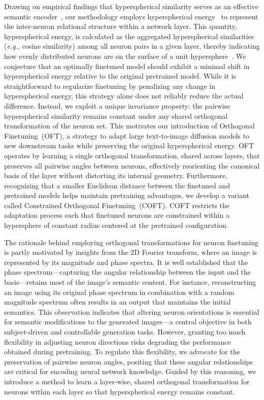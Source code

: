 Drawing on empirical findings that hyperspherical similarity serves as an effective semantic encoder~\cite{liu2017deep,liu2018decoupled,chen2020angular}, our methodology employs hyperspherical energy~\cite{liu2018learning} to represent the inter-neuron relational structure within a network layer. This quantity, hyperspherical energy, is calculated as the aggregated hyperspherical similarities (\emph{e.g.}, cosine similarity) among all neuron pairs in a given layer, thereby indicating how evenly distributed neurons are on the surface of a unit hypersphere~\cite{liu2021learning}. We conjecture that an optimally finetuned model should exhibit a minimal shift in hyperspherical energy relative to the original pretrained model. While it is straightforward to regularize finetuning by penalizing any change in hyperspherical energy, this strategy alone does not reliably reduce the actual difference. Instead, we exploit a unique invariance property: the pairwise hyperspherical similarity remains constant under any shared orthogonal transformation of the neuron set. This motivates our introduction of Orthogonal Finetuning~(OFT), a strategy to adapt large text-to-image diffusion models to new downstream tasks while preserving the original hyperspherical energy. OFT operates by learning a single orthogonal transformation, shared across layers, that preserves all pairwise angles between neurons, effectively reorienting the canonical basis of the layer without distorting its internal geometry. Furthermore, recognizing that a smaller Euclidean distance between the finetuned and pretrained models helps maintain pretraining advantages, we develop a variant called Constrained Orthogonal Finetuning~(COFT). COFT restricts the adaptation process such that finetuned neurons are constrained within a hypersphere of constant radius centered at the pretrained configuration.

The rationale behind employing orthogonal transformations for neuron finetuning is partly motivated by insights from the 2D Fourier transform, where an image is represented by its magnitude and phase spectra. It is well established that the phase spectrum—capturing the angular relationship between the input and the basis—retains most of the image’s semantic content. For instance, reconstructing an image using its original phase spectrum in combination with a random magnitude spectrum often results in an output that maintains the initial semantics. This observation indicates that altering neuron orientations is essential for semantic modifications to the generated images—a central objective in both subject-driven and controllable generation tasks. However, granting too much flexibility in adjusting neuron directions risks degrading the performance obtained during pretraining. To regulate this flexibility, we advocate for the preservation of pairwise neuron angles, positing that these angular relationships are critical for encoding neural network knowledge. Guided by this reasoning, we introduce a method to learn a layer-wise, shared orthogonal transformation for neurons within each layer so that hyperspherical energy remains constant.

